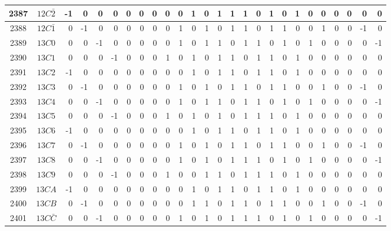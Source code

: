 \documentclass[12 pt]{article}%
\begin{document}
\begin{tiny}
\begin{centering}
\begin{longtable}{|c|c||rrrrrrrrrrrrrrrrrrrrrrrr|}
      \hline
      2387 & $12C\bar2$ & -1 & 0 & 0 & 0 & 0 & 0 & 0 & 0 & 0 & 1 & 0 & 1 & 1 & 1 & 0 & 1 & 0 & 1 & 0 & 0 & 0 & 0 & 0 & 0 \\
      \hline
      2388 & $12C\bar1$ & 0 & -1 & 0 & 0 & 0 & 0 & 0 & 0 & 1 & 0 & 1 & 0 & 1 & 1 & 0 & 1 & 1 & 0 & 0 & 1 & 0 & 0 & -1 & 0 \\
      \hline
      2389 & $13C0$ & 0 & 0 & -1 & 0 & 0 & 0 & 0 & 0 & 1 & 0 & 1 & 1 & 0 & 1 & 1 & 0 & 1 & 0 & 1 & 0 & 0 & 0 & 0 & -1 \\
      \hline
      2390 & $13C1$ & 0 & 0 & 0 & -1 & 0 & 0 & 0 & 1 & 0 & 1 & 0 & 1 & 1 & 0 & 1 & 1 & 0 & 1 & 0 & 0 & 0 & 0 & 0 & 0 \\
      \hline
      2391 & $13C2$ & -1 & 0 & 0 & 0 & 0 & 0 & 0 & 0 & 0 & 1 & 0 & 1 & 1 & 0 & 1 & 1 & 0 & 1 & 0 & 0 & 0 & 0 & 0 & 0 \\
      \hline
      2392 & $13C3$ & 0 & -1 & 0 & 0 & 0 & 0 & 0 & 0 & 1 & 0 & 1 & 0 & 1 & 1 & 0 & 1 & 1 & 0 & 0 & 1 & 0 & 0 & -1 & 0 \\
      \hline
      2393 & $13C4$ & 0 & 0 & -1 & 0 & 0 & 0 & 0 & 0 & 1 & 0 & 1 & 1 & 0 & 1 & 1 & 0 & 1 & 0 & 1 & 0 & 0 & 0 & 0 & -1 \\
      \hline
      2394 & $13C5$ & 0 & 0 & 0 & -1 & 0 & 0 & 0 & 1 & 0 & 1 & 0 & 1 & 0 & 1 & 1 & 1 & 0 & 1 & 0 & 0 & 0 & 0 & 0 & 0 \\
      \hline
      2395 & $13C6$ & -1 & 0 & 0 & 0 & 0 & 0 & 0 & 0 & 0 & 1 & 0 & 1 & 1 & 0 & 1 & 1 & 0 & 1 & 0 & 0 & 0 & 0 & 0 & 0 \\
      \hline
      2396 & $13C7$ & 0 & -1 & 0 & 0 & 0 & 0 & 0 & 0 & 1 & 0 & 1 & 0 & 1 & 1 & 0 & 1 & 1 & 0 & 0 & 1 & 0 & 0 & -1 & 0 \\
      \hline
      2397 & $13C8$ & 0 & 0 & -1 & 0 & 0 & 0 & 0 & 0 & 1 & 0 & 1 & 0 & 1 & 1 & 1 & 0 & 1 & 0 & 1 & 0 & 0 & 0 & 0 & -1 \\
      \hline
      2398 & $13C9$ & 0 & 0 & 0 & -1 & 0 & 0 & 0 & 1 & 0 & 0 & 1 & 1 & 0 & 1 & 1 & 1 & 0 & 1 & 0 & 0 & 0 & 0 & 0 & 0 \\
      \hline
      2399 & $13CA$ & -1 & 0 & 0 & 0 & 0 & 0 & 0 & 0 & 0 & 1 & 0 & 1 & 1 & 0 & 1 & 1 & 0 & 1 & 0 & 0 & 0 & 0 & 0 & 0 \\
      \hline
      2400 & $13CB$ & 0 & -1 & 0 & 0 & 0 & 0 & 0 & 0 & 0 & 1 & 1 & 0 & 1 & 1 & 0 & 1 & 1 & 0 & 0 & 1 & 0 & 0 & -1 & 0 \\
      \hline
      2401 & $13C\bar C$ & 0 & 0 & -1 & 0 & 0 & 0 & 0 & 0 & 1 & 0 & 1 & 0 & 1 & 1 & 1 & 0 & 1 & 0 & 1 & 0 & 0 & 0 & 0 & -1 \\

\end{longtable}
\end{centering}
\end{tiny}
\end{document}
